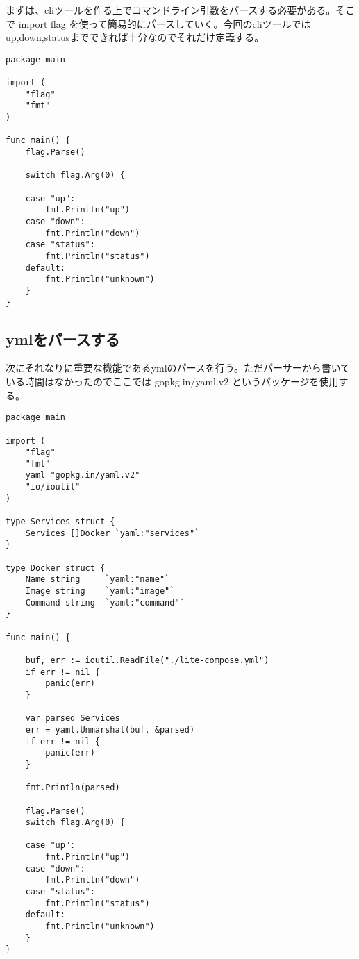 まずは、cliツールを作る上でコマンドライン引数をパースする必要がある。そこで import flag を使って簡易的にパースしていく。今回のcliツールではup,down,statusまでできれば十分なのでそれだけ定義する。

\begin{verbatim}
package main

import (
    "flag"
    "fmt"
)

func main() {
    flag.Parse()

    switch flag.Arg(0) {

    case "up":
        fmt.Println("up")
    case "down":
        fmt.Println("down")
    case "status":
        fmt.Println("status")
    default:
        fmt.Println("unknown")
    }
}
\end{verbatim}

\subsection{ymlをパースする}

次にそれなりに重要な機能であるymlのパースを行う。ただパーサーから書いている時間はなかったのでここでは gopkg.in/yaml.v2 というパッケージを使用する。

\begin{verbatim}
package main

import (
    "flag"
    "fmt"
    yaml "gopkg.in/yaml.v2"
    "io/ioutil"
)

type Services struct {
    Services []Docker `yaml:"services"`
}

type Docker struct {
    Name string     `yaml:"name"`
    Image string    `yaml:"image"`
    Command string  `yaml:"command"`
}

func main() {

    buf, err := ioutil.ReadFile("./lite-compose.yml")
    if err != nil {
        panic(err)
    }

    var parsed Services
    err = yaml.Unmarshal(buf, &parsed)
    if err != nil {
        panic(err)
    }

    fmt.Println(parsed)

    flag.Parse()
    switch flag.Arg(0) {

    case "up":
        fmt.Println("up")
    case "down":
        fmt.Println("down")
    case "status":
        fmt.Println("status")
    default:
        fmt.Println("unknown")
    }
}
\end{verbatim}

